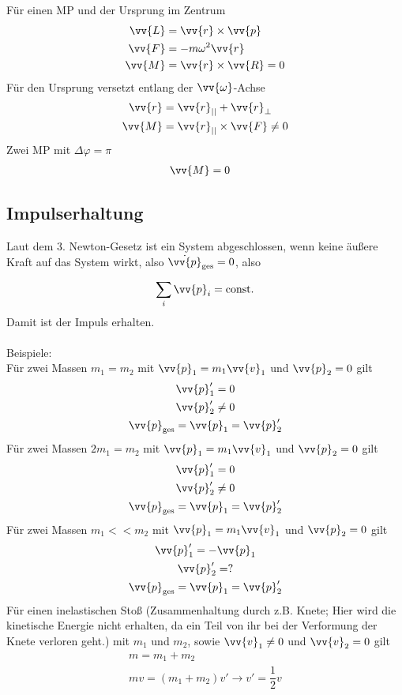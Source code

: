 \documentclass[a4paper,12pt]{article}
\numberwithin{equation}{section}
\begin{document}
Für einen MP und der Ursprung im Zentrum
\begin{align*}
        \vv{L}&=\vv{r}\times \vv{p}\\
        \vv{F}&=-m\omega ^2\vv{r}\\
        \vv{M}&=\vv{r}\times \vv{R}=0
\end{align*}
Für den Ursprung versetzt entlang der $\vv{\omega }$-Achse
\begin{align*}
        \vv{r}&=\vv{r}_{||}+\vv{r}_{\perp}\\
        \vv{M}&=\vv{r}_{||}\times\vv{F}\neq 0
\end{align*}
Zwei MP mit $\Delta \varphi =\pi $
\begin{align*}
        \vv{M}&=0
\end{align*}

\subsection{Impulserhaltung}
Laut dem 3. Newton-Gesetz ist ein System abgeschlossen, wenn keine äußere Kraft auf das System wirkt, also $\dot{\vv{p}}_{\text{ges}}=0$, also
\[ 
        \sum_{i}^{}\vv{p}_i=\text{const}
.\] 
Damit ist der Impuls erhalten.\\\\
Beispiele:\\
Für zwei Massen $m_1=m_2$ mit $\vv{p}_1=m_1\vv{v}_1$ und $\vv{p}_2=0$ gilt
\begin{gather*}
        \vv{p}'_1=0\\
        \vv{p}'_2\neq 0\\
        \vv{p}_{\text{ges}}=\vv{p}_1=\vv{p}'_2
\end{gather*}
Für zwei Massen $2m_1=m_2$ mit $\vv{p}_1=m_1\vv{v}_1$ und $\vv{p}_2=0$ gilt
\begin{gather*}
        \vv{p}'_1=0\\
        \vv{p}'_2\neq 0\\
        \vv{p}_{\text{ges}}=\vv{p}_1=\vv{p}'_2
\end{gather*}
Für zwei Massen $m_1<<m_2$ mit $\vv{p}_1=m_1\vv{v}_1$ und $\vv{p}_2=0$ gilt
\begin{gather*}
        \vv{p}'_1=-\vv{p}_1\\
        \vv{p}'_2=?\\
        \vv{p}_{\text{ges}}=\vv{p}_1=\vv{p}'_2
\end{gather*}
Für einen inelastischen Stoß (Zusammenhaltung durch z.B. Knete; Hier wird die kinetische Energie nicht erhalten, da ein Teil von ihr bei der Verformung der Knete verloren geht.) mit $m_1$ und $m_2$, sowie $\vv{v}_1\neq 0$ und $\vv{v}_2=0$ gilt
\begin{gather*}
        m=m_1+m_2\\
        mv=\left(m_1+m_2\right)v'\rightarrow v'=\dfrac{1}{2}v
\end{gather*}
\end{document}
